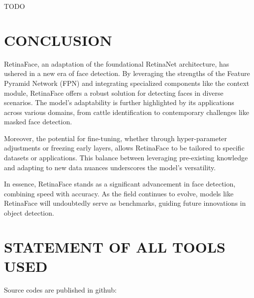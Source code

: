 \documentclass{article}
\begin{document}
TODO

\section{CONCLUSION}
\label{sec:conclusion}

RetinaFace, an adaptation of the foundational RetinaNet architecture, has ushered in a new era of face detection. By leveraging the strengths of the Feature Pyramid Network (FPN) and integrating specialized components like the context module, RetinaFace offers a robust solution for detecting faces in diverse scenarios. The model's adaptability is further highlighted by its applications across various domains, from cattle identification to contemporary challenges like masked face detection.

Moreover, the potential for fine-tuning, whether through hyper-parameter adjustments or freezing early layers, allows RetinaFace to be tailored to specific datasets or applications. This balance between leveraging pre-existing knowledge and adapting to new data nuances underscores the model's versatility.

In essence, RetinaFace stands as a significant advancement in face detection, combining speed with accuracy. As the field continues to evolve, models like RetinaFace will undoubtedly serve as benchmarks, guiding future innovations in object detection.


\section{STATEMENT OF ALL TOOLS USED}
\label{sec:statementofalltoolsused}


Source codes are published in github: 





\vfill\pagebreak



\end{document}
